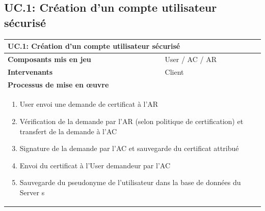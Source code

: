 \documentclass[a4paper,11pt,french]{article}
\begin{document}
\subsection{UC.1: Création d'un compte utilisateur sécurisé}
\begin{center}
	\vspace*{0.7cm}
	\begin{tabularx}{16cm}{|l|X|}
	\hline
	\multicolumn{2}{|l|}{\textbf{UC.1: Création d'un compte utilisateur sécurisé}}\\
	\hline
	\textbf{Composants mis en jeu} & User / AC / AR\\
	\hline
	\textbf{Intervenants} & Client\\
	\hline
	\multicolumn{2}{|l|}{\textbf{Processus de mise en \oe uvre}}\\
	\hline
	\multicolumn{2}{|p{15cm}|}{\begin{enumerate}\item User envoi une demande de certificat à l'AR \item Vérification de la demande par l'AR (selon politique de certification) et transfert de la demande à l'AC \item Signature de la demande par l'AC et sauvegarde du certificat attribué \item Envoi du certificat à l'User demandeur par l'AC \item Sauvegarde du pseudonyme de l'utilisateur dans la base de données du Server s \end{enumerate}}\\
	\hline
	\end{tabularx}
\end{center}

\end{document}
